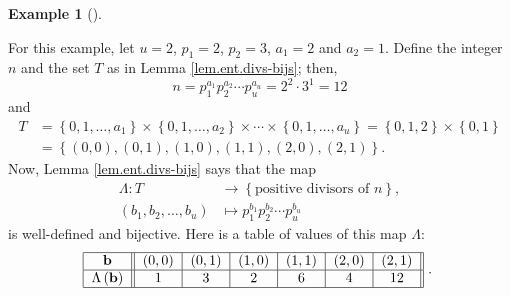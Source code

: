 \documentclass[numbers=enddot,12pt,final,onecolumn,notitlepage]{scrartcl}%
\numberwithin{exer}{subsection}
\theoremstyle{definition}
\newtheorem{exam}[theo]{Example}
\newenvironment{example}[1][]
{\begin{exam}[#1]\begin{leftbar}}
{\end{leftbar}\end{exam}}
\begin{document}
\begin{example}
For this example, let $u=2$, $p_{1}=2$, $p_{2}=3$, $a_{1}=2$ and $a_{2}=1$.
Define the integer $n$ and the set $T$ as in Lemma \ref{lem.ent.divs-bijs};
then,%
\[
n=p_{1}^{a_{1}}p_{2}^{a_{2}}\cdots p_{u}^{a_{u}}=2^{2}\cdot3^{1}=12
\]
and%
\begin{align*}
T  &  =\left\{  0,1,\ldots,a_{1}\right\}  \times\left\{  0,1,\ldots
,a_{2}\right\}  \times\cdots\times\left\{  0,1,\ldots,a_{u}\right\}  =\left\{
0,1,2\right\}  \times\left\{  0,1\right\} \\
&  =\left\{  \left(  0,0\right)  ,\left(  0,1\right)  ,\left(  1,0\right)
,\left(  1,1\right)  ,\left(  2,0\right)  ,\left(  2,1\right)  \right\}  .
\end{align*}
Now, Lemma \ref{lem.ent.divs-bijs} says that the map
\begin{align*}
\Lambda:T  &  \rightarrow\left\{  \text{positive divisors of }n\right\}  ,\\
\left(  b_{1},b_{2},\ldots,b_{u}\right)   &  \mapsto p_{1}^{b_{1}}p_{2}%
^{b_{2}}\cdots p_{u}^{b_{u}}%
\end{align*}
is well-defined and bijective. Here is a table of values of this map $\Lambda
$:%
\[%
\begin{tabular}
[c]{|c||c|c|c|c|c|c||}\hline
$\mathbf{b}$ & $\left(  0,0\right)  $ & $\left(  0,1\right)  $ & $\left(
1,0\right)  $ & $\left(  1,1\right)  $ & $\left(  2,0\right)  $ & $\left(
2,1\right)  $\\\hline
$\Lambda\left(  \mathbf{b}\right)  $ & $1$ & $3$ & $2$ & $6$ & $4$ &
$12$\\\hline
\end{tabular}
\ .\
\]

\end{example}
\end{document}
